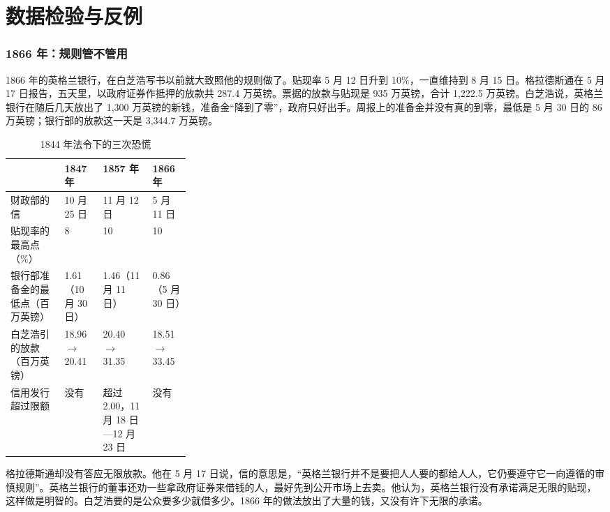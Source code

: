 \section{数据检验与反例}\label{sec:gold-test}

\subsubsection{1866 年：规则管不管用}
1866 年的英格兰银行，在白芝浩写书以前就大致照他的规则做了。贴现率 5 月 12 日升到 10\%，一直维持到 8 月 15 日\cite{boe2017}。格拉德斯通在 5 月 17 日报告，五天里，以政府证券作抵押的放款共 287.4 万英镑\cite{hansard1866}。票据的放款与贴现是 935 万英镑，合计 1,222.5 万英镑\cite{hansard1866}。白芝浩说，英格兰银行在随后几天放出了 1,300 万英镑的新钱，准备金“降到了零”，政府只好出手\cite{bagehot1873}。周报上的准备金并没有真的到零，最低是 5 月 30 日的 86 万英镑；银行部的放款这一天是 3,344.7 万英镑\cite{boe2017}。

\begin{table}[htbp]\centering\small
\caption{1844 年法令下的三次恐慌}\label{tab:gold-three}
\begin{tabularx}{\linewidth}{@{}>{\raggedright\arraybackslash}p{0.30\linewidth}YYY@{}}
\toprule
 & 1847 年 & 1857 年 & 1866 年 \\\midrule
财政部的信 & 10 月 25 日 & 11 月 12 日 & 5 月 11 日 \\
贴现率的最高点（\%） & 8 & 10 & 10 \\
银行部准备金的最低点（百万英镑） & 1.61（10 月 30 日） & 1.46（11 月 11 日） & 0.86（5 月 30 日） \\
白芝浩引的放款（百万英镑） & 18.96 $\to$ 20.41 & 20.40 $\to$ 31.35 & 18.51 $\to$ 33.45 \\
信用发行超过限额 & 没有 & 超过 2.00，11 月 18 日—12 月 23 日 & 没有 \\
\bottomrule
\end{tabularx}
\end{table}

格拉德斯通却没有答应无限放款。他在 5 月 17 日说，信的意思是，“英格兰银行并不是要把人人要的都给人人，它仍要遵守它一向遵循的审慎规则”\cite{hansard1866}。英格兰银行的董事还劝一些拿政府证券来借钱的人，最好先到公开市场上去卖\cite{hansard1866}。他认为，英格兰银行没有承诺满足无限的贴现，这样做是明智的\cite{hansard1866}。白芝浩要的是公众要多少就借多少。1866 年的做法放出了大量的钱，又没有许下无限的承诺。

